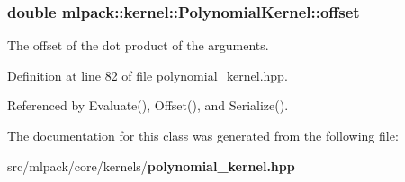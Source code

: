 \subsubsection[{offset}]{\setlength{\rightskip}{0pt plus 5cm}double mlpack\+::kernel\+::\+Polynomial\+Kernel\+::offset\hspace{0.3cm}{\ttfamily [private]}}\label{classmlpack_1_1kernel_1_1PolynomialKernel_a1ee8bdd31064437ad7e515052c0597e0}


The offset of the dot product of the arguments. 



Definition at line 82 of file polynomial\+\_\+kernel.\+hpp.



Referenced by Evaluate(), Offset(), and Serialize().



The documentation for this class was generated from the following file\+:\begin{DoxyCompactItemize}
\item 
src/mlpack/core/kernels/{\bf polynomial\+\_\+kernel.\+hpp}\end{DoxyCompactItemize}
